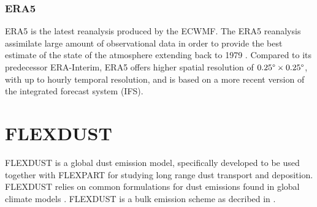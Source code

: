 \subsubsection{ERA5}
ERA5 is the latest reanalysis produced by the ECWMF. 
The ERA5 reanalysis assimilate large amount of observational data in order to provide the best estimate of the state of the atmosphere extending back to 1979 \parencite{hersbach_era5_2020}. Compared to its predecessor ERA-Interim, ERA5 offers higher spatial resolution of $0.25\degree \times 0.25\degree$, with up to hourly temporal resolution, and is based on a more recent version of the integrated forecast system (IFS). 

\section{FLEXDUST}\label{sec:flexdust}
FLEXDUST is a global dust emission model, specifically developed to be used together 
with FLEXPART for studying long range dust transport and deposition. FLEXDUST relies on common 
formulations for dust emissions found in global climate models \parencite{flexdust_ref_2016}. FLEXDUST is a bulk emission scheme as decribed in . 

